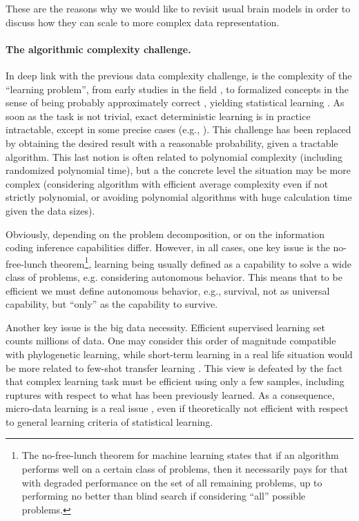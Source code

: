 \documentclass[a4,12pt,twoside]{article}
\begin{document}
These are the reasons why we would like to revisit usual brain models in order to discuss how they can scale to more complex data representation.

\paragraph{The algorithmic complexity challenge.}

In deep link with the previous data complexity challenge, is the complexity of the ``learning problem'', from early studies in the field \cite{bush-mosteller:57}, to formalized concepts in the sense of being probably approximately correct \cite{valiant2013probably}, yielding statistical learning \cite{vapnik:98,cucker-smale:01}. As soon as the task is not trivial, exact deterministic learning is in practice intractable, except in some precise cases (e.g., \cite{angluin1983inductive}). This challenge has been replaced by obtaining the desired result with a reasonable probability, given a tractable algorithm. This last notion is often related to polynomial complexity (including randomized polynomial time), but a the concrete level the situation may be more complex (considering algorithm with efficient average complexity even if not strictly polynomial, or avoiding polynomial algorithms with huge calculation time given the data sizes).

 Obviously, depending on the problem decomposition, or on the information coding inference capabilities differ. However, in all cases, one key issue is the no-free-lunch theorem\footnote{The no-free-lunch theorem for machine learning states that if an algorithm performs well on a certain class of problems, then it necessarily pays for that with degraded performance on the set of all remaining problems, up to performing no better than blind search if considering ``all'' possible problems.}, learning being usually defined as a capability to solve a wide class of problems, e.g. considering autonomous behavior. This means that to be efficient we must define autonomous behavior, e.g., survival, not as universal capability, but ``only'' as the capability to survive.

Another key issue is the big data necessity. Efficient supervised learning set counts millions of data. One may consider this order of magnitude compatible with phylogenetic learning, while short-term learning in a real life situation would be more related to few-shot transfer learning \cite{Ruder2017Transfer}. This view is defeated by the fact that complex learning task must be efficient using only a few samples, including ruptures with respect to what has been previously learned. As a consequence, micro-data learning is a real issue \cite{mouret2016micro}, even if theoretically not efficient with respect to general learning criteria of statistical learning.
\end{document}
